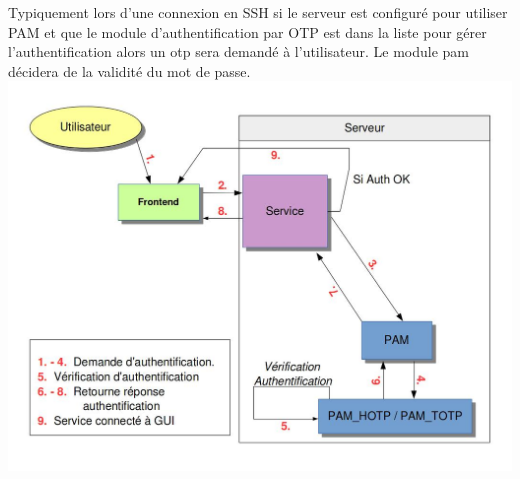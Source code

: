 \documentclass{"../../res/univ-projet"}
\begin{document}
Typiquement lors d'une connexion en SSH si le serveur est configuré pour utiliser PAM et que le module
d'authentification par OTP est dans la liste pour gérer l'authentification alors un otp sera demandé
à l'utilisateur. Le module pam décidera de la validité du mot de passe.
\newline
\includegraphics[width=\textwidth]{../graphics/authentification.jpg}
\end{document}
